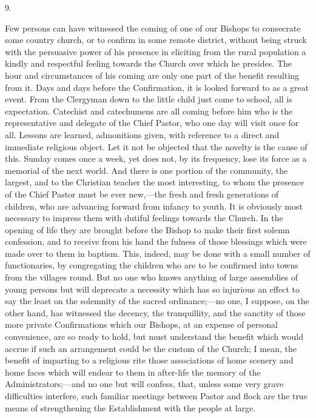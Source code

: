 9.

Few persons can have witnessed the coming of one
of our Bishops to consecrate some country church, or to confirm in
some remote district, without being struck with the persuasive power
of his presence in eliciting from the rural population a kindly and
respectful feeling towards the Church over which he presides. The hour
and circumstances of his coming are only one part of the benefit
resulting from it. Days and days before the Confirmation, it is looked
forward to as a great event. From the Clergyman down to the little
child just come to school, all is expectation. Catechist and
catechumens are all coming before him who is the representative and
delegate of the Chief Pastor, who one day will visit once for all.
Lessons are learned, admonitions given, with reference to a direct and
immediate religious object. Let it not be objected that the novelty is
the cause of this. Sunday comes once a week, yet does not, by its
frequency, lose its force as a memorial of the next world. And there
is one portion of the community, the largest, and to the Christian
teacher the most interesting, to whom the presence of the Chief Pastor
must be ever new,—the fresh and fresh generations of children, who
are advancing forward from infancy to youth. It is obviously most
necessary to impress them with dutiful feelings towards the Church. In
the opening of life they are brought before the Bishop to make their
first solemn confession, and to receive from his hand the fulness
of those blessings which were made over to them in baptism. This,
indeed, may be done with a small number of functionaries, by
congregating the children who are to be confirmed into towns from the
villages round. But no one who knows anything of large assemblies of
young persons but will deprecate a necessity which has so injurious an
effect to say the least on the solemnity of the sacred ordinance;—no
one, I suppose, on the other hand, has witnessed the decency, the
tranquillity, and the sanctity of those more private Confirmations
which our Bishops, at an expense of personal convenience, are so ready
to hold, but must understand the benefit which would accrue if such an
arrangement could be the custom of the Church; I mean, the benefit of
imparting to a religious rite those associations of home scenery and
home faces which will endear to them in after-life the memory of the
Administrators;—and no one but will confess, that, unless some very
grave difficulties interfere, such familiar meetings between Pastor
and flock are the true means of strengthening the Establishment with
the people at large.

